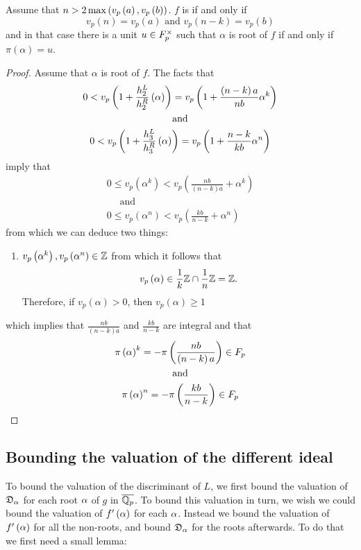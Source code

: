 \documentclass[../main.tex]{subfiles}
\begin{document}
\begin{lemma}
  Assume that $n > 2 \max\left( v_p\left( a \right), v_p\left( b \right) \right)$.
  $f$ is \ex if and only if 
  \[
    v_p\left( n \right) = v_p\left( a \right)
    \text{ and }
    v_p\left( n - k \right) = v_p\left( b \right)  
  \] 
  and in that case there is a unit $u \in F_p^\times$ such that $\alpha$ is \anex root of $f$ if and only if $\pi\left( \alpha \right) = u$.
\end{lemma}
\begin{proof}
  Assume that $\alpha$ is \anex root of $f$.
  The facts that
  \begin{gather*}
    0 < v_p\left( 1 + \frac{h_{2}^L}{h_{2}^R}\left( \alpha  \right) \right) = v_p\left( 1 + \frac{\left( n-k \right)a}{nb}\alpha^k \right)
    \\
    \quad \text{ and } \quad \\ 
    0 < v_p\left( 1 + \frac{h_{3}^L}{h_{3}^R}\left( \alpha \right) \right) = v_p\left( 1 + \frac{n - k}{kb}\alpha^{n} \right) 
  \end{gather*}
  imply that
  \begin{gather*}
    0 \leq v_p\left( \alpha^k \right) < v_p\left( \frac{nb}{\left( n-k \right)a} + \alpha^k \right)
    \\
    \quad \text{ and } \quad \\ 
    0 \leq v_p\left( \alpha^n \right) < v_p\left( \frac{kb}{n - k} + \alpha^{n} \right) 
  \end{gather*}
  from which we can deduce two things:
  \begin{enumerate}
    \item $v_p\left( \alpha^k \right), v_p\left( \alpha^n \right) \in \mathbb{Z}$ from which it follows that 
    \[
      v_p\left( \alpha \right) \in \frac{1}{k}\mathbb{Z} \cap \frac{1}{n}\mathbb{Z} = \mathbb{Z}.
    \]
    Therefore, if $v_p\left( \alpha \right) > 0$, then $v_p\left( \alpha \right) \geq 1$ 
  \end{enumerate} 
  which implies that $\frac{nb}{\left( n-k \right)a}$ and $\frac{kb}{n - k}$ are integral and that
  \begin{gather*}
    \pi\left( \alpha \right)^k
    =
    -\pi\left( \frac{nb}{\left( n-k \right)a} \right) \in F_p
    \\
    \quad \text{ and } \quad \\ 
    \pi\left( \alpha \right)^n
    =
    -\pi\left( \frac{kb}{n - k} \right) \in F_p
  \end{gather*} 
\end{proof}

\subsection{Bounding the valuation of the different ideal \label{subsection:different_bounds}}
To bound the valuation of the discriminant of $L$, we first bound the valuation of $\mathfrak{D}_\alpha$ for each root $\alpha$ of $g$ in $\overline{\mathbb{Q}_p}$.
To bound this valuation in turn, we wish we could bound the valuation of $f'\left( \alpha \right)$ for each $\alpha$.
Instead we bound the valuation of $f'\left( \alpha \right)$ for all the non-\ex roots, and bound $\mathfrak{D}_\alpha$ for the \ex roots afterwards.
To do that we first need a small lemma:
\end{document}
